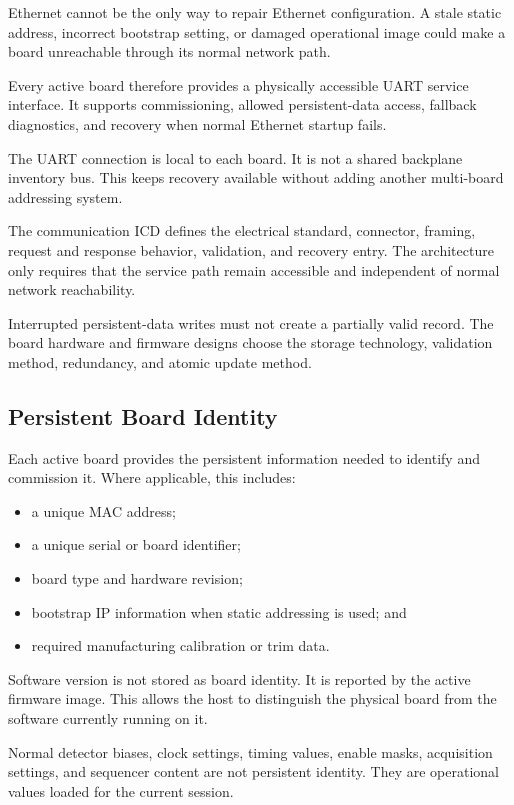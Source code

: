Ethernet cannot be the only way to repair Ethernet configuration. A stale static address, incorrect bootstrap setting, or damaged operational image could make a board unreachable through its normal network path.

Every active board therefore provides a physically accessible UART service interface. It supports commissioning, allowed persistent-data access, fallback diagnostics, and recovery when normal Ethernet startup fails.

The UART connection is local to each board. It is not a shared backplane inventory bus. This keeps recovery available without adding another multi-board addressing system.

The communication ICD defines the electrical standard, connector, framing, request and response behavior, validation, and recovery entry. The architecture only requires that the service path remain accessible and independent of normal network reachability.

Interrupted persistent-data writes must not create a partially valid record. The board hardware and firmware designs choose the storage technology, validation method, redundancy, and atomic update method.

\subsection{Persistent Board Identity}

Each active board provides the persistent information needed to identify and commission it. Where applicable, this includes:

\begin{itemize}
  \item a unique MAC address;
  \item a unique serial or board identifier;
  \item board type and hardware revision;
  \item bootstrap IP information when static addressing is used; and
  \item required manufacturing calibration or trim data.
\end{itemize}

Software version is not stored as board identity. It is reported by the active firmware image. This allows the host to distinguish the physical board from the software currently running on it.

Normal detector biases, clock settings, timing values, enable masks, acquisition settings, and sequencer content are not persistent identity. They are operational values loaded for the current session.


